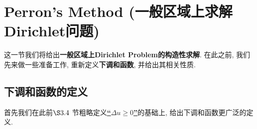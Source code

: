\newpage

\section{Perron's Method (一般区域上求解Dirichlet问题)}
	这一节我们将给出\textbf{一般区域上Dirichlet Problem的构造性求解}. 在此之前, 我们先来做一些准备工作, 重新定义\textbf{下调和函数}, 并给出其相关性质. 
	
\vspace*{2em}

\subsection{下调和函数的定义}
	首先我们在此前$\S 3.4$ 节粗略定义\underline{\textbf{“$\Delta u \geq 0$”}}的基础上, 给出下调和函数更广泛的定义. 
	
	\vspace*{1em}
	
